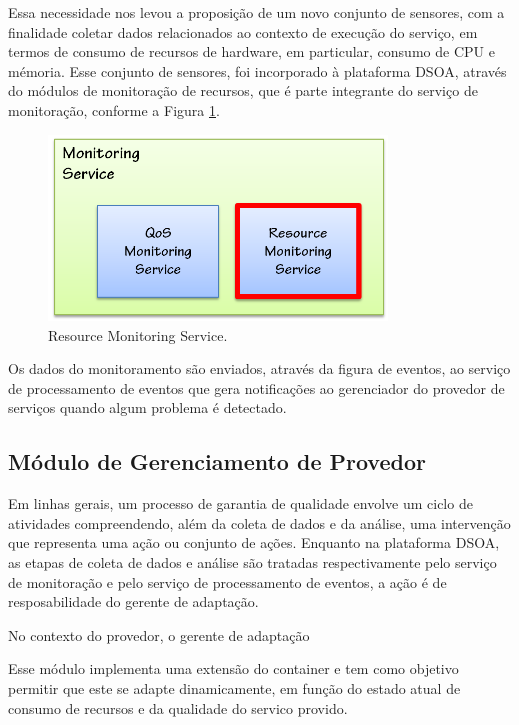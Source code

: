 Essa necessidade nos levou a proposição de um novo conjunto de sensores, com a finalidade coletar dados relacionados ao contexto de execução do serviço, em termos de consumo de recursos de hardware, em particular, consumo de CPU e mémoria. Esse conjunto de sensores, foi incorporado à plataforma DSOA, através do módulos de monitoração de recursos, que é parte integrante do serviço de monitoração, conforme a Figura \ref{fig:resc_module}.

\begin{figure}[htp]
\centering
\includegraphics[width=9cm]{chapters/chapter4/monitoring-service.png}
\caption[Resource Monitoring Service]{Resource Monitoring Service.}
\label{fig:resc_module}
\end{figure}


Os dados do monitoramento são enviados, através da figura de eventos, ao serviço de processamento de eventos que gera notificações ao gerenciador do provedor de serviços quando algum problema é detectado.%

\subsection{Módulo de Gerenciamento de Provedor}

Em linhas gerais, um processo de garantia de qualidade envolve um ciclo de atividades compreendendo, além da coleta de dados e da análise, uma intervenção que representa uma ação ou conjunto de ações. Enquanto na plataforma DSOA, as etapas de coleta de dados e análise são tratadas respectivamente pelo serviço de monitoração e pelo serviço de processamento de eventos, a ação é de resposabilidade do gerente de adaptação.

No contexto do provedor, o gerente de adaptação

Esse módulo implementa uma extensão do container e tem como objetivo permitir que este se adapte dinamicamente, em função do estado atual de consumo de recursos e da qualidade do servico provido. 



